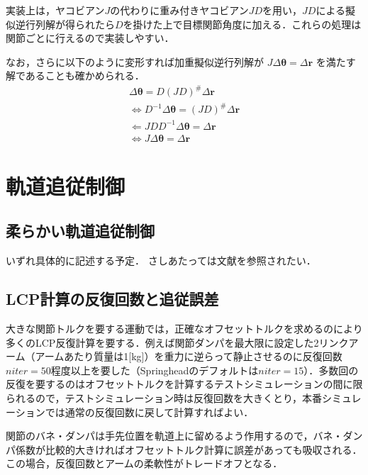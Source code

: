 \documentclass[a4paper,10pt, twocolumn, fleqn]{jsarticle}
\begin{document}
実装上は，ヤコビアン$J$の代わりに重み付きヤコビアン$JD$を用い，$JD$による擬似逆行列解が得られたら$D$を掛けた上で目標関節角度に加える．これらの処理は関節ごとに行えるので実装しやすい．


なお，さらに以下のように変形すれば加重擬似逆行列解が $J \varDelta\bm{\theta} = \varDelta\bm{r}$ を満たす解であることも確かめられる．
\begin{gather*}
\varDelta\bm{\theta} = D (JD)^\# \varDelta\bm{r} \\
\iff D^{-1} \varDelta\bm{\theta} = (JD)^\# \varDelta\bm{r} \\
\Leftarrow JD D^{-1} \varDelta\bm{\theta} = \varDelta\bm{r} \\
\iff J \varDelta\bm{\theta} = \varDelta\bm{r}
\end{gather*}






\section{軌道追従制御}

\subsection{柔らかい軌道追従制御}

いずれ具体的に記述する予定．
さしあたっては文献\cite{pliantmotion}を参照されたい．


\subsection{LCP計算の反復回数と追従誤差}

大きな関節トルクを要する運動では，正確なオフセットトルクを求めるのにより多くのLCP反復計算を要する．例えば関節ダンパを最大限に設定した2リンクアーム（アームあたり質量は1[kg]）を重力に逆らって静止させるのに反復回数$niter = 50$程度以上を要した（Springheadのデフォルトは$niter=15$）．多数回の反復を要するのはオフセットトルクを計算するテストシミュレーションの間に限られるので，テストシミュレーション時は反復回数を大きくとり，本番シミュレーションでは通常の反復回数に戻して計算すればよい．

関節のバネ・ダンパは手先位置を軌道上に留めるよう作用するので，バネ・ダンパ係数が比較的大きければオフセットトルク計算に誤差があっても吸収される．この場合，反復回数とアームの柔軟性がトレードオフとなる．
\end{document}
